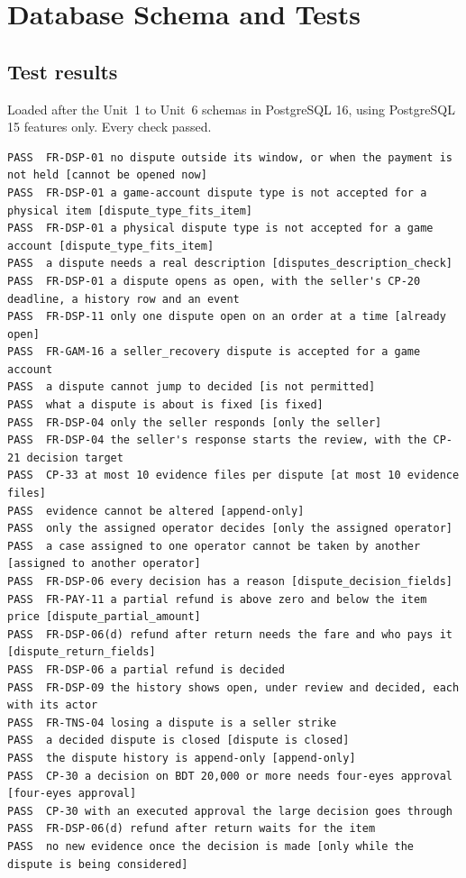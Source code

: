 \documentclass[11pt,a4paper]{article}
\begin{document}
\section{Database Schema and Tests}
\label{app:ddl}
\subsection{Test results}
\label{app:tests}
Loaded after the Unit~1 to Unit~6 schemas in PostgreSQL 16, using PostgreSQL 15 features only. Every check passed.
{\scriptsize
\begin{verbatim}
PASS  FR-DSP-01 no dispute outside its window, or when the payment is not held [cannot be opened now]
PASS  FR-DSP-01 a game-account dispute type is not accepted for a physical item [dispute_type_fits_item]
PASS  FR-DSP-01 a physical dispute type is not accepted for a game account [dispute_type_fits_item]
PASS  a dispute needs a real description [disputes_description_check]
PASS  FR-DSP-01 a dispute opens as open, with the seller's CP-20 deadline, a history row and an event
PASS  FR-DSP-11 only one dispute open on an order at a time [already open]
PASS  FR-GAM-16 a seller_recovery dispute is accepted for a game account
PASS  a dispute cannot jump to decided [is not permitted]
PASS  what a dispute is about is fixed [is fixed]
PASS  FR-DSP-04 only the seller responds [only the seller]
PASS  FR-DSP-04 the seller's response starts the review, with the CP-21 decision target
PASS  CP-33 at most 10 evidence files per dispute [at most 10 evidence files]
PASS  evidence cannot be altered [append-only]
PASS  only the assigned operator decides [only the assigned operator]
PASS  a case assigned to one operator cannot be taken by another [assigned to another operator]
PASS  FR-DSP-06 every decision has a reason [dispute_decision_fields]
PASS  FR-PAY-11 a partial refund is above zero and below the item price [dispute_partial_amount]
PASS  FR-DSP-06(d) refund after return needs the fare and who pays it [dispute_return_fields]
PASS  FR-DSP-06 a partial refund is decided
PASS  FR-DSP-09 the history shows open, under review and decided, each with its actor
PASS  FR-TNS-04 losing a dispute is a seller strike
PASS  a decided dispute is closed [dispute is closed]
PASS  the dispute history is append-only [append-only]
PASS  CP-30 a decision on BDT 20,000 or more needs four-eyes approval [four-eyes approval]
PASS  CP-30 with an executed approval the large decision goes through
PASS  FR-DSP-06(d) refund after return waits for the item
PASS  no new evidence once the decision is made [only while the dispute is being considered]

\end{verbatim}}
\end{document}
